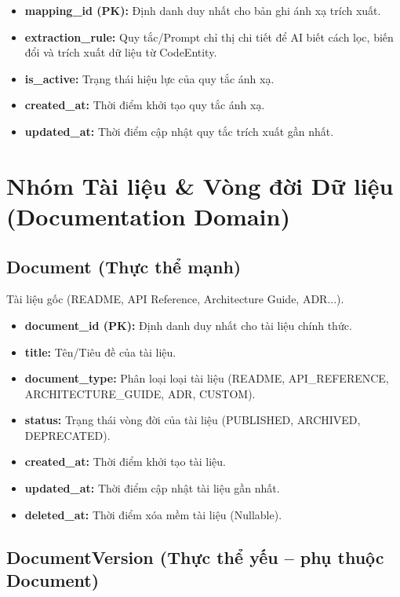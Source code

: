 \begin{itemize}
    \item \textbf{mapping\_id (PK):} Định danh duy nhất cho bản ghi ánh xạ trích xuất.
    \item \textbf{extraction\_rule:} Quy tắc/Prompt chỉ thị chi tiết để AI biết cách lọc, biến đổi và trích xuất dữ liệu từ CodeEntity.
    \item \textbf{is\_active:} Trạng thái hiệu lực của quy tắc ánh xạ.
    \item \textbf{created\_at:} Thời điểm khởi tạo quy tắc ánh xạ.
    \item \textbf{updated\_at:} Thời điểm cập nhật quy tắc trích xuất gần nhất.
\end{itemize}


\section{Nhóm Tài liệu \& Vòng đời Dữ liệu (Documentation Domain)}

\subsection{Document (Thực thể mạnh)}

Tài liệu gốc (README, API Reference, Architecture Guide, ADR...).

\begin{itemize}
    \item \textbf{document\_id (PK):} Định danh duy nhất cho tài liệu chính thức.
    \item \textbf{title:} Tên/Tiêu đề của tài liệu.
    \item \textbf{document\_type:} Phân loại loại tài liệu (README, API\_REFERENCE, ARCHITECTURE\_GUIDE, ADR, CUSTOM).
    \item \textbf{status:} Trạng thái vòng đời của tài liệu (PUBLISHED, ARCHIVED, DEPRECATED).
    \item \textbf{created\_at:} Thời điểm khởi tạo tài liệu.
    \item \textbf{updated\_at:} Thời điểm cập nhật tài liệu gần nhất.
    \item \textbf{deleted\_at:} Thời điểm xóa mềm tài liệu (Nullable).
\end{itemize}


\subsection{DocumentVersion (Thực thể yếu -- phụ thuộc Document)}

